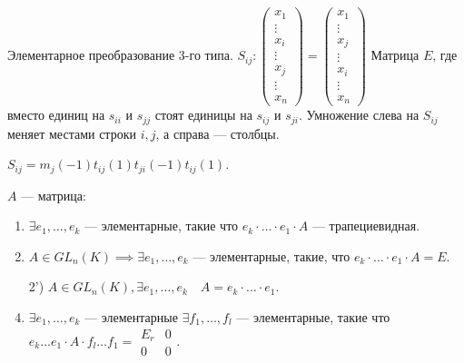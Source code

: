 \begin{remark}
    Элементарное преобразование 3-го типа.
    $S_{ij}\!: \begin{pmatrix} x_1 \\ \vdots \\ x_i \\ \vdots \\ x_j \\ \vdots \\x_n \end{pmatrix} = \begin{pmatrix} x_1 \\ \vdots \\ x_j \\ \vdots \\ x_i \\ \vdots \\x_n \end{pmatrix}$
    Матрица $E$, где вместо единиц на  $s_{ii}$ и $s_{jj}$ стоят единицы на  $s_{ij}$ и  $s_{ji}$. Умножение слева на $S_{ij}$ меняет местами строки $i, j$, а справа --- столбцы.

    $S_{ij} = m_{j}(-1)t_{ij}(1)t_{ji}(-1)t_{ij}(1)$.
\end{remark}
\begin{theorem}
    $A$ --- матрица:
    \begin{enumerate}
        \item $\exists e_1, \ldots, e_k$ --- элементарные, такие что $e_k \cdot \ldots \cdot e_1 \cdot A$ --- трапециевидная.
        \item $A \in GL_n(K) \implies \exists e_1, \ldots, e_k$ --- элементарные, такие, что $e_k \cdot \ldots \cdot e_1 \cdot A = E$.
        \item[2')] $A \in GL_n(K), \exists e_1, \ldots, e_k \quad A=e_k \cdot \ldots \cdot e_1$.
        \item $\exists e_1, \ldots, e_k$ --- элементарные $\exists f_1,\ldots, f_l$ --- элементарные, такие что $e_k \ldots e_1 \cdot A \cdot f_l \ldots f_1 = \begin{array}{|c|c|} E_r & 0 \\ \hline 0 & 0 \end{array}$.
    \end{enumerate}
\end{theorem}
